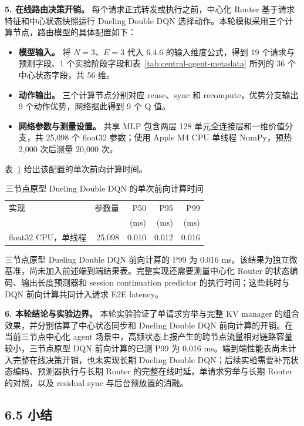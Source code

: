 \medskip
\noindent\textbf{5. 在线路由决策开销。}
每个请求正式转发或执行之前，中心化 Router 基于请求特征和中心状态快照运行 Dueling Double DQN 选择动作。本轮模拟采用三个计算节点，路由模型的具体配置如下：
\begin{itemize}
    \item \textbf{模型输入。} 将 \(N=3\)、\(E=3\) 代入 6.4.6 的输入维度公式，得到 19 个请求与预测字段、1 个实验阶段字段和表~\ref{tab:central-agent-metadata} 所列的 36 个中心状态字段，共 56 维。
    \item \textbf{动作输出。} 三个计算节点分别对应 reuse、sync 和 recompute，优势分支输出 9 个动作优势，网络据此得到 9 个 Q 值。
    \item \textbf{网络参数与测量设置。} 共享 MLP 包含两层 128 单元全连接层和一维价值分支，共 25,098 个 float32 参数；使用 Apple M4 CPU 单线程 NumPy，预热 2,000 次后测量 20,000 次。
\end{itemize}
表~\ref{tab:dqn-forward-overhead} 给出该配置的单次前向计算时间。

\begin{table}[H]
\centering
\small
\caption{三节点原型 Dueling Double DQN 的单次前向计算时间}
\label{tab:dqn-forward-overhead}
\begin{tabular}{@{}lrrrr@{}}
\toprule
实现 & 参数量 & P50 & P95 & P99 \\
 & & (ms) & (ms) & (ms) \\
\midrule
float32 CPU，单线程
& 25,098 & 0.010 & 0.012 & 0.016 \\
\bottomrule
\end{tabular}
\end{table}

三节点原型 Dueling Double DQN 前向计算的 P99 为 0.016 ms。该结果为独立微基准，尚未加入前述端到端结果表。完整实现还需要测量中心化 Router 的状态编码、输出长度预测器和 session continuation predictor 的执行时间；这些耗时与 DQN 前向计算共同计入请求 E2E latency。

\medskip
\noindent\textbf{6. 本轮结论与实验边界。}
本轮实验验证了单请求穷举与完整 KV manager 的组合效果，并分别估算了中心状态同步和 Dueling Double DQN 前向计算的开销。在当前三节点中心化 agent 场景中，高频状态上报产生的跨节点流量相对链路容量较小，三节点原型 DQN 前向计算的已测 P99 为 0.016 ms。端到端性能表尚未计入完整在线决策开销，也未实现长期 Dueling Double DQN；后续实验需要补充状态编码、预测器执行与长期 Router 的完整在线时延，单请求穷举与长期 Router 的对照，以及 residual sync 与后台预放置的消融。

\subsection*{6.5 小结}

